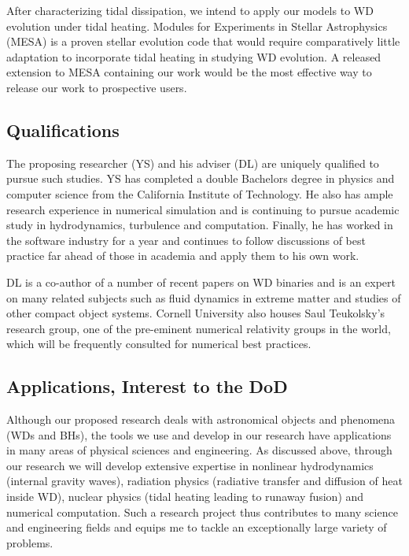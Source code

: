 \documentclass[11pt,
        usenames, %
        dvipsnames %
    ]{article}
\begin{document}
After characterizing tidal dissipation, we intend to apply our models to WD
evolution under tidal heating. Modules for Experiments in Stellar Astrophysics
(MESA) is a proven stellar evolution code that would require comparatively
little adaptation to incorporate tidal heating in studying WD
evolution\cite{MESA}. A released extension to MESA containing our work would be
the most effective way to release our work to prospective users.

\subsection{Qualifications}\label{ss:quals}

The proposing researcher (YS) and his adviser (DL) are uniquely qualified to
pursue such studies. YS has completed a double Bachelors degree in physics and
computer science from the California Institute of Technology. He also has ample
research experience in numerical simulation and is continuing to pursue academic
study in hydrodynamics, turbulence and computation. Finally, he has worked in
the software industry for a year and continues to follow discussions of best
practice far ahead of those in academia and apply them to his own work.

DL is a co-author of a number of recent papers on WD binaries and is an
expert on many related subjects such as fluid dynamics in extreme matter and
studies of other compact object systems. Cornell University also houses Saul
Teukolsky's research group, one of the pre-eminent numerical relativity groups
in the world, which will be frequently consulted for numerical best practices.

\subsection{Applications, Interest to the DoD}

Although our proposed research deals with astronomical objects and phenomena
(WDs and BHs), the tools we use and develop in our research
have applications in many areas of physical sciences and engineering. As
discussed above, through our research we will develop extensive expertise in
nonlinear hydrodynamics (internal gravity waves), radiation physics (radiative
transfer and diffusion of heat inside WD), nuclear physics (tidal heating
leading to runaway fusion) and numerical computation. Such a research project
thus contributes to many science and engineering fields and equips me to tackle
an exceptionally large variety of problems.
\end{document}
